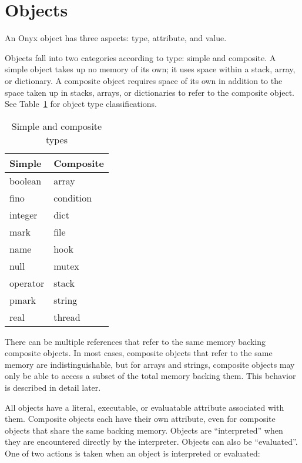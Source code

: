 \section{Objects}
\label{sec:onyx_objects}

An Onyx object has three aspects: type, attribute, and value.

Objects fall into two categories according to type: simple and composite.  A
simple object takes up no memory of its own; it uses space within a stack,
array, or dictionary.  A composite object requires space of its own in addition
to the space taken up in stacks, arrays, or dictionaries to refer to the
composite object.  See Table~\ref{simple-composite} for object type
classifications.

\begin{table}[htb]
\begin{center}
\begin{tabular}{|l|l|}
\hline
Simple	& Composite	\\
\hline \hline
boolean	& array		\\
fino	& condition	\\
integer	& dict		\\
mark	& file		\\
name	& hook		\\
null	& mutex		\\
operator & stack	\\
pmark	& string	\\
real	& thread	\\
\hline
\end{tabular}
\end{center}
\caption{\label{simple-composite}
Simple and composite types}
\end{table}

There can be multiple references that refer to the same memory backing composite
objects.  In most cases, composite objects that refer to the same memory are
indistinguishable, but for arrays and strings, composite objects may only be
able to access a subset of the total memory backing them.  This behavior is
described in detail later.

All objects have a literal, executable, or evaluatable attribute associated with
them.  Composite objects each have their own attribute, even for composite
objects that share the same backing memory.  Objects are ``interpreted'' when
they are encountered directly by the interpreter.  Objects can also be
``evaluated''.  One of two actions is taken when an object is interpreted or
evaluated:


